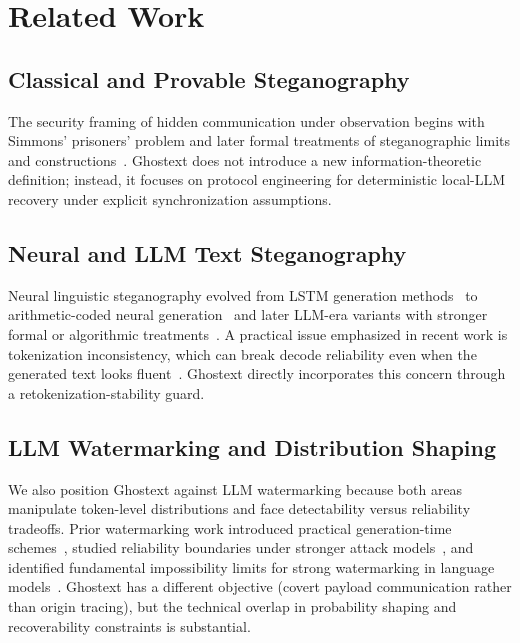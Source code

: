 \section{Related Work}
\subsection{Classical and Provable Steganography}
The security framing of hidden communication under observation begins with Simmons' prisoners' problem and later formal treatments of steganographic limits and constructions~\cite{DBLP:conf/crypto/Simmons83,DBLP:journals/jsac/AndersonP98,DBLP:conf/crypto/HopperLA02}. Ghostext does not introduce a new information-theoretic definition; instead, it focuses on protocol engineering for deterministic local-LLM recovery under explicit synchronization assumptions.

\subsection{Neural and LLM Text Steganography}
Neural linguistic steganography evolved from LSTM generation methods~\cite{DBLP:conf/acl/FangJA17} to arithmetic-coded neural generation~\cite{ziegler-etal-2019-neural} and later LLM-era variants with stronger formal or algorithmic treatments~\cite{DBLP:conf/acl/ZhangYYH21,DBLP:conf/naacl/LinLZL24,DBLP:journals/tdsc/QiCZZY25}. A practical issue emphasized in recent work is tokenization inconsistency, which can break decode reliability even when the generated text looks fluent~\cite{DBLP:conf/emnlp/YanM25}. Ghostext directly incorporates this concern through a retokenization-stability guard.

\subsection{LLM Watermarking and Distribution Shaping}
We also position Ghostext against LLM watermarking because both areas manipulate token-level distributions and face detectability versus reliability tradeoffs. Prior watermarking work introduced practical generation-time schemes~\cite{conf/icml/KirchenbauerGWK23}, studied reliability boundaries under stronger attack models~\cite{conf/iclr/KirchenbauerGWS24}, and identified fundamental impossibility limits for strong watermarking in language models~\cite{conf/icml/ZhangEF0AB24}. Ghostext has a different objective (covert payload communication rather than origin tracing), but the technical overlap in probability shaping and recoverability constraints is substantial.

